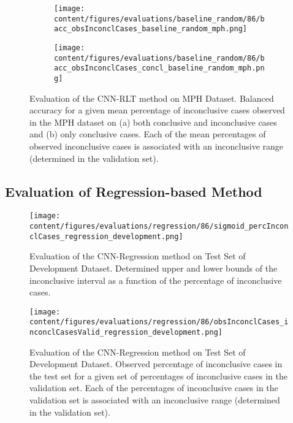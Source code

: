\begin{figure}[t]
\begin{subfigure}{0.9\textwidth}
  \centering
  \texttt{[image: content/figures/evaluations/baseline\_random/86/bacc\_obsInconclCases\_baseline\_random\_mph.png]}
  \subcaption{}
  \label{fig:bacc_obsInconclCases_baseline_random_mph}
\end{subfigure}
\hfill
\begin{subfigure}{0.9\textwidth}
  \centering
  \texttt{[image: content/figures/evaluations/baseline\_random/86/bacc\_obsInconclCases\_concl\_baseline\_random\_mph.png]}
  \subcaption{}
  \label{fig:bacc_obsInconclCases_concl_baseline_random_mph}
\end{subfigure}

\caption{Evaluation of the CNN-RLT method on MPH Dataset.
Balanced accuracy for a given mean percentage of inconclusive cases observed in the MPH dataset on 
(a) both conclusive and inconclusive cases and (b) only conclusive cases. 
Each of the mean percentages of observed inconclusive cases is associated 
with an inconclusive range (determined in the validation set). }
\label{fig:bacc_obsInconclCases_baseline_random_mph_full}
\end{figure}


\subsection{Evaluation of Regression-based Method}
\label{subsec:eval_regression}




\begin{figure}[t]
  \centering
  \texttt{[image: content/figures/evaluations/regression/86/sigmoid\_percInconclCases\_regression\_development.png]}
  \caption{Evaluation of the CNN-Regression method on Test Set of Development Dataset. 
  Determined upper and lower bounds of the inconclusive interval as a function of the percentage of inconclusive cases.} 
  \label{fig:regression_percInconclCases_development}
\end{figure}


\begin{figure}[h]
  \centering
  \texttt{[image: content/figures/evaluations/regression/86/obsInconclCases\_inconclCasesValid\_regression\_development.png]}
  \caption{Evaluation of the CNN-Regression method on Test Set of Development Dataset.
  Observed percentage of inconclusive cases in the test set 
  for a given set of percentages of inconclusive cases in the validation set.
  Each of the percentages of inconclusive cases in the validation set is associated 
  with an inconclusive range (determined in the validation set).} 
  \label{fig:obsInconclCases_inconclCasesValid_regression_development}
\end{figure} 


